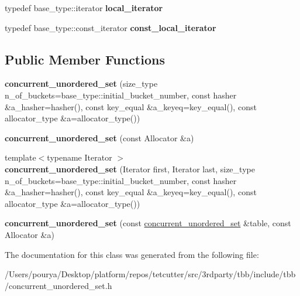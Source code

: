 \begin{DoxyCompactItemize}
\item 
\hypertarget{classtbb_1_1interface5_1_1concurrent__unordered__set_acb12b4b1df9a7108a5193b0d3bbfc677}{}typedef base\+\_\+type\+::iterator {\bfseries local\+\_\+iterator}\label{classtbb_1_1interface5_1_1concurrent__unordered__set_acb12b4b1df9a7108a5193b0d3bbfc677}

\item 
\hypertarget{classtbb_1_1interface5_1_1concurrent__unordered__set_af111bc738ee2a1b4b1cf2967a1252322}{}typedef base\+\_\+type\+::const\+\_\+iterator {\bfseries const\+\_\+local\+\_\+iterator}\label{classtbb_1_1interface5_1_1concurrent__unordered__set_af111bc738ee2a1b4b1cf2967a1252322}

\end{DoxyCompactItemize}
\subsection*{Public Member Functions}
\begin{DoxyCompactItemize}
\item 
\hypertarget{classtbb_1_1interface5_1_1concurrent__unordered__set_aad5e3bd7fa156e5d8aa81a8ff560d84e}{}{\bfseries concurrent\+\_\+unordered\+\_\+set} (size\+\_\+type n\+\_\+of\+\_\+buckets=base\+\_\+type\+::initial\+\_\+bucket\+\_\+number, const hasher \&a\+\_\+hasher=hasher(), const key\+\_\+equal \&a\+\_\+keyeq=key\+\_\+equal(), const allocator\+\_\+type \&a=allocator\+\_\+type())\label{classtbb_1_1interface5_1_1concurrent__unordered__set_aad5e3bd7fa156e5d8aa81a8ff560d84e}

\item 
\hypertarget{classtbb_1_1interface5_1_1concurrent__unordered__set_a2d307ae4ebb3e2d46b0a75713824d109}{}{\bfseries concurrent\+\_\+unordered\+\_\+set} (const Allocator \&a)\label{classtbb_1_1interface5_1_1concurrent__unordered__set_a2d307ae4ebb3e2d46b0a75713824d109}

\item 
\hypertarget{classtbb_1_1interface5_1_1concurrent__unordered__set_afd4bc55194c4473e81398d8456a5c68a}{}{\footnotesize template$<$typename Iterator $>$ }\\{\bfseries concurrent\+\_\+unordered\+\_\+set} (Iterator first, Iterator last, size\+\_\+type n\+\_\+of\+\_\+buckets=base\+\_\+type\+::initial\+\_\+bucket\+\_\+number, const hasher \&a\+\_\+hasher=hasher(), const key\+\_\+equal \&a\+\_\+keyeq=key\+\_\+equal(), const allocator\+\_\+type \&a=allocator\+\_\+type())\label{classtbb_1_1interface5_1_1concurrent__unordered__set_afd4bc55194c4473e81398d8456a5c68a}

\item 
\hypertarget{classtbb_1_1interface5_1_1concurrent__unordered__set_aecea62fe5c8beab0d7907dbc33ef583f}{}{\bfseries concurrent\+\_\+unordered\+\_\+set} (const \hyperlink{classtbb_1_1interface5_1_1concurrent__unordered__set}{concurrent\+\_\+unordered\+\_\+set} \&table, const Allocator \&a)\label{classtbb_1_1interface5_1_1concurrent__unordered__set_aecea62fe5c8beab0d7907dbc33ef583f}

\end{DoxyCompactItemize}


The documentation for this class was generated from the following file\+:\begin{DoxyCompactItemize}
\item 
/\+Users/pourya/\+Desktop/platform/repos/tetcutter/src/3rdparty/tbb/include/tbb/concurrent\+\_\+unordered\+\_\+set.\+h\end{DoxyCompactItemize}
